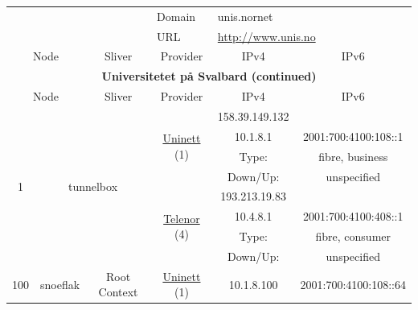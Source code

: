 \begin{small}
\begin{center}
\begin{longtable}{|c|c|c|c|c|c|c|c|}
 \multicolumn{4}{|c|}{} & \multicolumn{1}{|l|}{Domain} & \multicolumn{3}{|l|}{\index{unis.nornet}unis.nornet} \\* \cline{5-5}\cline{6-6}\cline{7-7}\cline{8-8}
 \multicolumn{4}{|c|}{} & \multicolumn{1}{|l|}{URL} & \multicolumn{3}{|l|}{\url{http://www.unis.no}} \\ \hline
 \multicolumn{2}{|p{8em}|}{Node} & \multicolumn{2}{|p{8em}|}{Sliver} & \multicolumn{2}{|p{8em}|}{Provider} & IPv4 & IPv6 \\ \hline
\endfirsthead
\hline
 \multicolumn{8}{|c|}{\textbf{Universitetet på Svalbard (continued)}} \\ \hline
 \multicolumn{2}{|p{8em}|}{Node} & \multicolumn{2}{|p{8em}|}{Sliver} & \multicolumn{2}{|p{8em}|}{Provider} & IPv4 & IPv6 \\ \hline
\endhead
 \multirow{8}{*}{\tiny{1}} & \multicolumn{3}{|c|}{\multirow{8}{*}{\tiny{tunnelbox}}} & \multicolumn{2}{|c|}{\multirow{4}{*}{\tiny{\href{https://www.uninett.no}{Uninett} (1)}}} & \tiny{158.39.149.132} & \frownie{} \\* \cline{7-7}\cline{8-8}
  & \multicolumn{3}{|c|}{} & \multicolumn{2}{|c|}{} & \tiny{10.1.8.1} & \tiny{2001:700:4100:108::1} \\* \cline{7-7}\cline{8-8}
  & \multicolumn{3}{|c|}{} & \multicolumn{2}{|c|}{} & Type: & fibre, business \\* \cline{7-7}\cline{8-8}
  & \multicolumn{3}{|c|}{} & \multicolumn{2}{|c|}{} & Down/Up:  & unspecified \\* \cline{5-5}\cline{6-6}\cline{7-7}\cline{8-8}
  & \multicolumn{3}{|c|}{} & \multicolumn{2}{|c|}{\multirow{4}{*}{\tiny{\href{https://www.telenor.no}{Telenor} (4)}}} & \tiny{193.213.19.83} & \frownie{} \\* \cline{7-7}\cline{8-8}
  & \multicolumn{3}{|c|}{} & \multicolumn{2}{|c|}{} & \tiny{10.4.8.1} & \tiny{2001:700:4100:408::1} \\* \cline{7-7}\cline{8-8}
  & \multicolumn{3}{|c|}{} & \multicolumn{2}{|c|}{} & Type: & fibre, consumer \\* \cline{7-7}\cline{8-8}
  & \multicolumn{3}{|c|}{} & \multicolumn{2}{|c|}{} & Down/Up:  & unspecified \\ \hline
 \multirow{20}{*}{\tiny{100}} & \multicolumn{1}{|l|}{\multirow{20}{*}{\tiny{snoeflak}}} & \multicolumn{2}{|c|}{\multirow{2}{*}{\tiny{Root Context}}} & \multicolumn{2}{|c|}{\tiny{\href{https://www.uninett.no}{Uninett} (1)}} & \tiny{10.1.8.100} & \tiny{2001:700:4100:108::64} \\* \cline{5-5}\cline{6-6}\cline{7-7}\cline{8-8}

\end{longtable}
\end{center}
\end{small}
